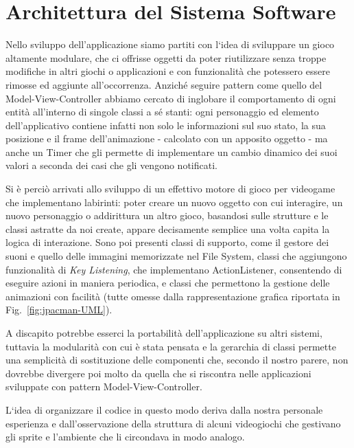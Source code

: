 \documentclass[12pt,a4paper]{report}
\begin{document}
\section{Architettura del Sistema Software}\label{ch:arch}
Nello sviluppo dell’applicazione siamo partiti con l`idea di sviluppare un gioco altamente modulare, che ci offrisse oggetti da poter riutilizzare senza troppe modifiche in altri giochi o applicazioni e con funzionalità che potessero essere rimosse ed aggiunte all’occorrenza. Anziché seguire pattern come quello del Model-View-Controller abbiamo cercato di inglobare il comportamento di ogni entità all’interno di singole classi a sé stanti: ogni personaggio ed elemento dell’applicativo contiene infatti non solo le informazioni sul suo stato, la sua posizione e il frame dell’animazione - calcolato con un apposito oggetto - ma anche un Timer che gli permette di implementare un cambio dinamico dei suoi valori a seconda dei casi che gli vengono notificati.

Si è perciò arrivati allo sviluppo di un effettivo motore di gioco per videogame che implementano labirinti: poter creare un nuovo oggetto con cui interagire, un nuovo personaggio o addirittura un altro gioco, basandosi sulle strutture e le classi astratte da noi create, appare decisamente semplice una volta capita la logica di interazione. Sono poi presenti classi di supporto, come il gestore dei suoni e quello delle immagini memorizzate nel File System, classi che aggiungono funzionalità di \textit{Key Listening}, che implementano ActionListener, consentendo di eseguire azioni in maniera periodica, e classi che permettono la gestione delle animazioni con facilità (tutte omesse dalla rappresentazione grafica riportata in Fig.~\ref{fig:jpacman-UML}).

A discapito potrebbe esserci la portabilità dell’applicazione su altri sistemi, tuttavia la modularità con cui è stata pensata e la gerarchia di classi permette una semplicità di sostituzione delle componenti che, secondo il nostro parere, non dovrebbe divergere poi molto da quella che si riscontra nelle applicazioni sviluppate con pattern Model-View-Controller.

L`idea di organizzare il codice in questo modo deriva dalla nostra personale esperienza e dall’osservazione della struttura di alcuni videogiochi che gestivano gli sprite e l’ambiente che li circondava in modo analogo.
\end{document}
